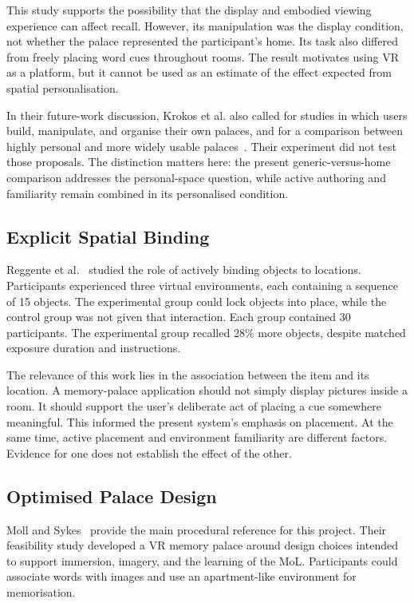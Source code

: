 This study supports the possibility that the display and embodied viewing experience can affect recall. However, its manipulation was the display condition, not whether the palace represented the participant's home. Its task also differed from freely placing word cues throughout rooms. The result motivates using VR as a platform, but it cannot be used as an estimate of the effect expected from spatial personalisation.

In their future-work discussion, Krokos et al. also called for studies in which users build, manipulate, and organise their own palaces, and for a comparison between highly personal and more widely usable palaces~\cite{krokos2019}. Their experiment did not test those proposals. The distinction matters here: the present generic-versus-home comparison addresses the personal-space question, while active authoring and familiarity remain combined in its personalised condition.

\subsection{Explicit Spatial Binding}
Reggente et al.~\cite{reggente2020} studied the role of actively binding objects to locations. Participants experienced three virtual environments, each containing a sequence of 15 objects. The experimental group could lock objects into place, while the control group was not given that interaction. Each group contained 30 participants. The experimental group recalled 28\% more objects, despite matched exposure duration and instructions.

The relevance of this work lies in the association between the item and its location. A memory-palace application should not simply display pictures inside a room. It should support the user's deliberate act of placing a cue somewhere meaningful. This informed the present system's emphasis on placement. At the same time, active placement and environment familiarity are different factors. Evidence for one does not establish the effect of the other.

\subsection{Optimised Palace Design}
Moll and Sykes~\cite{moll2023} provide the main procedural reference for this project. Their feasibility study developed a VR memory palace around design choices intended to support immersion, imagery, and the learning of the MoL. Participants could associate words with images and use an apartment-like environment for memorisation.


